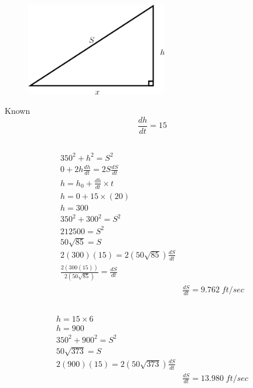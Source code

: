 \documentclass[16pt letter]{article}
\begin{document}
\section{}
\label{q:10}
\begin{figure}[h]
	\centering
	\includegraphics[width=0.55\textwidth]{Application Q10}
\end{figure}
Known \[\frac{dh}{dt} = 15\]

\subsection{}
\begin{align*}
	350^2 + h^2 = S^2                                 \\
	0 + 2h \frac{dh}{dt} = 2S \frac{dS}{dt}           \\[20pt]
	h = h_0 + \frac{dh}{dt}  \times t                 \\
	h = 0 + 15  \times  (20)                          \\
	h = 300                                           \\[20pt]
	350^2 + 300^2 = S^2                               \\
	212500 = S^2                                      \\
	50\sqrt{85} = S                                   \\
	2(300)(15) = 2(50\sqrt{85}) \frac{dS}{dt}         \\
	\frac{2(300(15))}{2(50\sqrt{85})} = \frac{dS}{dt} \\
	 & \frac{dS}{dt} = 9.762\;ft/sec
\end{align*}

\subsection{}
\begin{align*}
	h = 15  \times  6                          \\
	h = 900                                    \\[20pt]
	350^2 + 900^2 = S^2                        \\
	50\sqrt{373} = S                           \\
	2(900)(15) = 2(50\sqrt{373}) \frac{dS}{dt} \\
	 & \frac{dS}{dt} = 13.980\; ft/sec
\end{align*}
\end{document}
